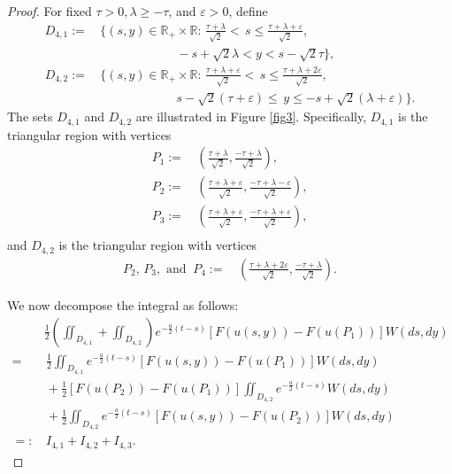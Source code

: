 \documentclass[11pt,reqno]{amsart}
\numberwithin{equation}{section}
\newcommand{\1}{{\bf 1}}
\newcommand{\2}{{\bf 2}}
\begin{document}
\begin{proof}
   For   fixed $\tau>0, \lambda\ge -\tau$, and $\varepsilon>0$,  define  
\begin{align*}
D_{4,1}:= & \, \Bigg\{(s, y)\in \mathbb R_+\times \mathbb R:\,  \frac{\tau+\lambda}{\sqrt 2} <  \,  s\le \frac{\tau+\lambda+\varepsilon}{\sqrt 2},\\
 & \,\,\,\,\,\,\,\,\,\,\,    \,\,\,\,\,\,\,\,\,\,\,  \,\,\,\,  \,\,\,\, \,\,\,\,  \,\, \,\, -s+\sqrt{2}\lambda <  y < s-\sqrt{2}\tau \Bigg\},\\
D_{4,2}:=&  \, \Bigg\{(s,y)\in \mathbb R_+\times \mathbb R :\,  \frac{\tau+\lambda+\varepsilon}{\sqrt 2} <  \, s \le \frac{\tau+\lambda+2\varepsilon}{\sqrt 2},\\
 & \,\,\,\,\,\,\,\,\,\,\,    \,\,\,\,\,\,\,\,\,\,\, \,\,\,\,  \,\,\,\,  \,\,\,\, \,\,\,\,    s-\sqrt{2}(\tau+\varepsilon)\le \, y\le -s+\sqrt 2(\lambda+ \varepsilon) \Bigg\}.
\end{align*}
 The  sets $D_{4, 1}$ and $D_{4, 2}$ are  illustrated in Figure \ref{fig3}. Specifically,   $D_{4,1}$ is the triangular region with vertices 
\begin{equation}\label{eq P}
\begin{split}  
   P_1 :=&\, \left(\frac{\tau+\lambda}{\sqrt 2}, \frac{-\tau+\lambda}{\sqrt 2}\right),\\
     P_2:=&\,  \left(\frac{\tau+\lambda+\varepsilon}{\sqrt 2}, \frac{-\tau+\lambda-\varepsilon}{\sqrt 2}\right),\\
P_3:=&\, \left(\frac{\tau+\lambda+\varepsilon}{\sqrt 2}, \frac{-\tau+\lambda+\varepsilon}{\sqrt 2}\right),\\
  \end{split}  
\end{equation}
and $D_{4, 2}$ is the triangular region with vertices 
\begin{align*}
 P_2 , \, P_3,  \text{ and }\  P_4 :=&\,  \left(\frac{\tau+\lambda+2\varepsilon}{\sqrt 2}, \frac{-\tau+\lambda}{\sqrt 2}\right).
\end{align*}

We now decompose  the integral as follows:
\begin{align*}
 &  \frac{1}{2}\left(\iint_{D_{4,1}}+\iint_{D_{4, 2}} \right) e^{-\frac{a}{2}(t-s)}\left[F(u(s,y))-F(u(P_1)) \right]W(ds,dy)\\
=&\,  \frac{1}{2} \iint_{D_{4,1}} e^{-\frac{a}{2}(t-s)} \left[F(u(s, y))-F(u(P_1))\right]W(ds,dy) \\
&\,  +\frac{1}{2}   \left[F(u(P_2))- F(u(P_1)) \right] \iint_{D_{4,2}}  e^{-\frac{a}{2}(t-s)}W(ds,dy)\\
&\, +   \frac{1}{2} \iint_{D_{4,2}}e^{-\frac{a}{2}(t-s)}  \left[F(u(s,y))-F(u(P_2)) \right]W(ds,dy)\\
=:&\,  I_{4,1}+I_{4,2}+I_{4, 3}.
\end{align*} 


\end{proof}
\end{document}
